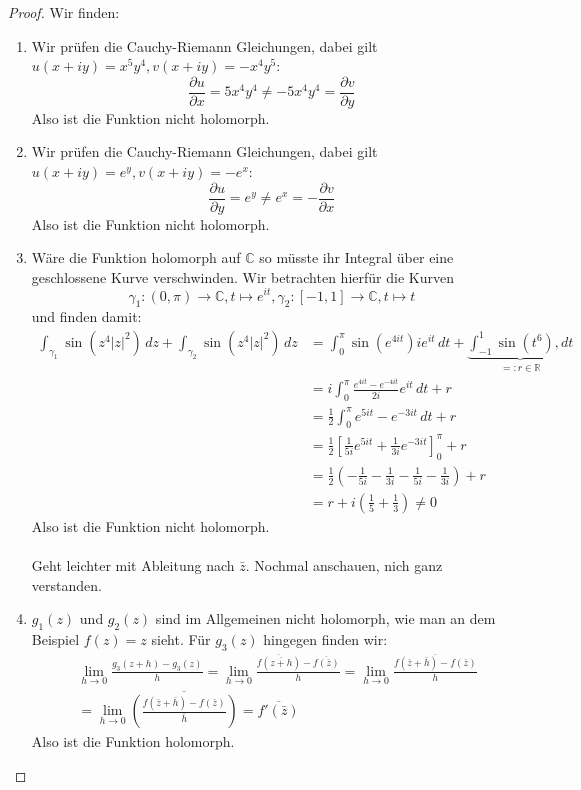 \documentclass[11pt]{article}
\newcommand{\R}{\mathbb{R}}
\newcommand{\C}{\mathbb{C}}
\begin{document}
    \begin{proof}
        Wir finden:
        \begin{enumerate}[label = (\alph*)]
            \item Wir prüfen die Cauchy-Riemann Gleichungen, dabei gilt $u(x+iy)=x^{5}y^4, v(x+iy) = -x^{4}y^5$:
            $$\frac{\partial u}{\partial x} = 5x^4y^4\neq -5x^4 y^4 = \frac{\partial v}{\partial y}$$
            Also ist die Funktion nicht holomorph.
            \item Wir prüfen die Cauchy-Riemann Gleichungen, dabei gilt $u(x+iy)=e^y, v(x+iy) = -e^x$:
            $$\frac{\partial u}{\partial y} = e^y\neq e^x = -\frac{\partial v}{\partial x}$$
            Also ist die Funktion nicht holomorph.
            \item Wäre die Funktion holomorph auf $\C$ so müsste ihr Integral über eine geschlossene Kurve 
            verschwinden. Wir betrachten hierfür die Kurven
            $$\gamma_1: (0,\pi)\to\C, t\mapsto e^{it}, \gamma_2: [-1,1]\to\C, t\mapsto t$$
            und finden damit:
            $$\begin{aligned}
                  \int_{\gamma_1}\sin \left(z^4|z|^2\right)\,dz +\int_{\gamma_2}\sin \left(z^4|z|^2\right)\,dz &=
                  \int_{0}^{\pi} \sin \left(e^{4it}\right)ie^{it}\,dt + \underbrace{\int_{-1}^1 \sin(t^6),dt}_{=:r\in\R}
                  \\&= i\int_{0}^{\pi} \frac{e^{4it}-e^{-4it}}{2i} e^{it}\,dt+r
                  \\&=\frac{1}{2}\int_{0}^{\pi}e^{5it}-e^{-3it}\,dt+r
                  \\&= \frac{1}{2}\left[\frac{1}{5i}e^{5it}+\frac{1}{3i}e^{-3it}\right]_0^{\pi}+r
                  \\&=\frac{1}{2}\left(-\frac{1}{5i}-\frac{1}{3i}-\frac{1}{5i}-\frac{1}{3i}\right)+r
                  \\&= r+ i\left(\frac{1}{5}+\frac{1}{3}\right)\neq 0
            \end{aligned}$$
            Also ist die Funktion nicht holomorph.\\\\
            Geht leichter mit Ableitung nach $\bar{z}$. Nochmal anschauen, nich ganz verstanden.
            \item $g_1(z)$ und $g_2(z)$ sind im Allgemeinen nicht holomorph, wie man an dem Beispiel $f(z) = z$ sieht.
            Für $g_3(z)$ hingegen finden wir:
            $$\begin{aligned}
                  &\lim_{h\to0} \frac{g_3(z+h)-g_3(z)}{h} = \lim_{h\to0}
                  \frac{\overline{f(\overline{z+h})}-\overline{f(\bar{z})}}{h} = \lim_{h\to0}
                  \frac{\overline{f(\bar{z}+\bar{h})-f(\bar{z})}}{h} \\&= \lim_{h\to0}
                  \overline{\left(\frac{f(\bar{z}+\bar{h})-f(\bar{z})}{\bar{h}}\right)} =
                  \overline{f'(\bar{z})}
            \end{aligned}$$
            Also ist die Funktion holomorph.
        \end{enumerate}
    \end{proof}
\end{document}
